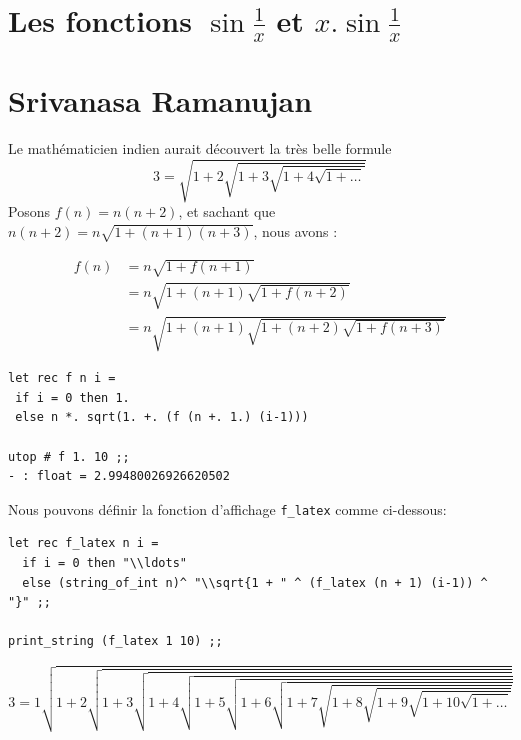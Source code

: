 \section{Les fonctions $\sin \frac{1}{x}$ et $x . \sin \frac{1}{x}$ }
\begin{center}
\hspace{1cm}
\end{center}

\section{Srivanasa Ramanujan}
Le mathématicien indien aurait  découvert la très belle formule 
$$ 3 = \sqrt{1+2\sqrt{1+3\sqrt{1+4\sqrt{1+\ldots}}}} $$
Posons $f(n) = n(n+2)$, et sachant que $n(n+2) = n \sqrt{1+(n+1)(n+3)}$, nous avons :

\begin{align*}
	f(n) &= n\sqrt{1+f(n+1)} \\
	 	 &= n\sqrt{1+(n+1)\sqrt{1+f(n+2)}} \\
	 	 &= n\sqrt{1+(n+1)\sqrt{1+(n+2)\sqrt{1+f(n+3)}}}
\end{align*}

\begin{Verbatim}
let rec f n i =
 if i = 0 then 1.
 else n *. sqrt(1. +. (f (n +. 1.) (i-1)))

utop # f 1. 10 ;;
- : float = 2.99480026926620502
\end{Verbatim}

Nous pouvons définir la fonction d'affichage \verb+f_latex+ comme ci-dessous:
\begin{Verbatim}
let rec f_latex n i =
  if i = 0 then "\\ldots"  
  else (string_of_int n)^ "\\sqrt{1 + " ^ (f_latex (n + 1) (i-1)) ^ "}" ;;

print_string (f_latex 1 10) ;;	
\end{Verbatim}
$$3 = 1\sqrt{1 + 2\sqrt{1 + 3\sqrt{1 + 4\sqrt{1 + 5\sqrt{1 + 6\sqrt{1 + 7\sqrt{1 + 8\sqrt{1 + 9\sqrt{1 + 10\sqrt{1 + \ldots}}}}}}}}}}
$$

